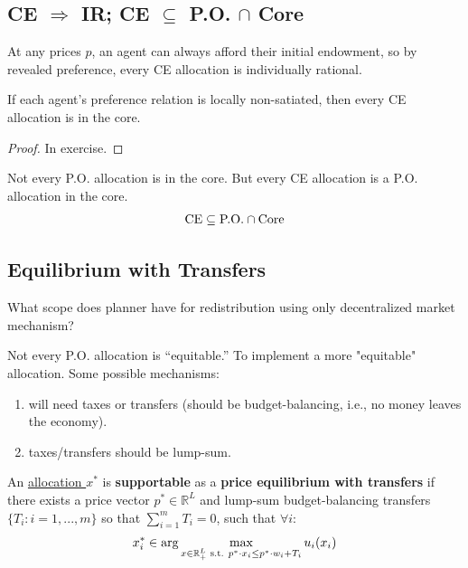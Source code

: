 \documentclass[11pt]{elegantbook}
\begin{document}
\subsection{CE $\Rightarrow$ IR; CE $\subseteq$ P.O. $\cap$ Core}
\begin{note}[CE $\Rightarrow$ IR]
    At any prices $p$, an agent can always afford their initial endowment, so by revealed preference, every CE allocation is individually rational.
\end{note}
\begin{corollary}
    If each agent's preference relation is locally non-satiated, then every CE allocation is in the core.
\end{corollary}
\begin{proof}
    In exercise.
\end{proof}
\begin{note}
    Not every P.O. allocation is in the core. But every CE allocation is a P.O. allocation in the core.
    \begin{equation}
        \begin{aligned}
            \textnormal{CE}\subseteq \textnormal{P.O.}\cap \textnormal{Core}
        \end{aligned}
        \nonumber
    \end{equation}
\end{note}


\subsection{Equilibrium with Transfers}
What scope does planner have for redistribution using only decentralized market mechanism?

Not every P.O. allocation is ``equitable.'' To implement a more "equitable" allocation. Some possible mechanisms:
\begin{enumerate}[$\circ$]
    \item will need taxes or transfers (should be budget-balancing, i.e., no money leaves the economy).
    \item taxes/transfers should be lump-sum.
\end{enumerate}

\begin{definition}
\normalfont
    An \underline{allocation $x^*$} is \textbf{supportable} as a \textbf{price equilibrium with transfers} if there exists a price vector $p^*\in \mathbb{R}^L$ and lump-sum budget-balancing transfers $\{T_i:i=1,...,m\}$ so that $\sum_{i=1}^m T_i=0$, such that $\forall i$:
    \begin{equation}
        \begin{aligned}
            x_i^*\in \arg\max_{x\in \mathbb{R}^L_+ \textnormal{ s.t. } p^*\cdot x_i\leq p^*\cdot w_i + T_i}u_i(x_i)
        \end{aligned}
        \nonumber
    \end{equation}
\end{definition}
\end{document}
